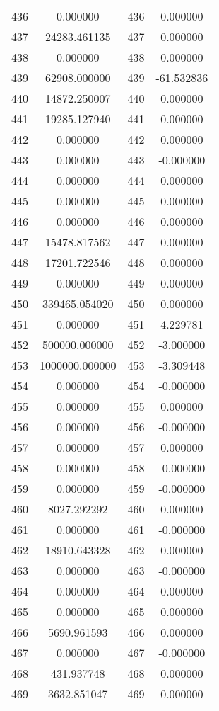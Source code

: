 \documentclass[12pt]{article}
\begin{document}
\begin{longtable}{@{}cccc@{}}
436 & 0.000000 & 436 & 0.000000 \\
437 & 24283.461135 & 437 & 0.000000 \\
438 & 0.000000 & 438 & 0.000000 \\
439 & 62908.000000 & 439 & -61.532836 \\
440 & 14872.250007 & 440 & 0.000000 \\
441 & 19285.127940 & 441 & 0.000000 \\
442 & 0.000000 & 442 & 0.000000 \\
443 & 0.000000 & 443 & -0.000000 \\
444 & 0.000000 & 444 & 0.000000 \\
445 & 0.000000 & 445 & 0.000000 \\
446 & 0.000000 & 446 & 0.000000 \\
447 & 15478.817562 & 447 & 0.000000 \\
448 & 17201.722546 & 448 & 0.000000 \\
449 & 0.000000 & 449 & 0.000000 \\
450 & 339465.054020 & 450 & 0.000000 \\
451 & 0.000000 & 451 & 4.229781 \\
452 & 500000.000000 & 452 & -3.000000 \\
453 & 1000000.000000 & 453 & -3.309448 \\
454 & 0.000000 & 454 & -0.000000 \\
455 & 0.000000 & 455 & 0.000000 \\
456 & 0.000000 & 456 & -0.000000 \\
457 & 0.000000 & 457 & 0.000000 \\
458 & 0.000000 & 458 & -0.000000 \\
459 & 0.000000 & 459 & -0.000000 \\
460 & 8027.292292 & 460 & 0.000000 \\
461 & 0.000000 & 461 & -0.000000 \\
462 & 18910.643328 & 462 & 0.000000 \\
463 & 0.000000 & 463 & -0.000000 \\
464 & 0.000000 & 464 & 0.000000 \\
465 & 0.000000 & 465 & 0.000000 \\
466 & 5690.961593 & 466 & 0.000000 \\
467 & 0.000000 & 467 & -0.000000 \\
468 & 431.937748 & 468 & 0.000000 \\
469 & 3632.851047 & 469 & 0.000000 \\

\end{longtable}
\end{document}
